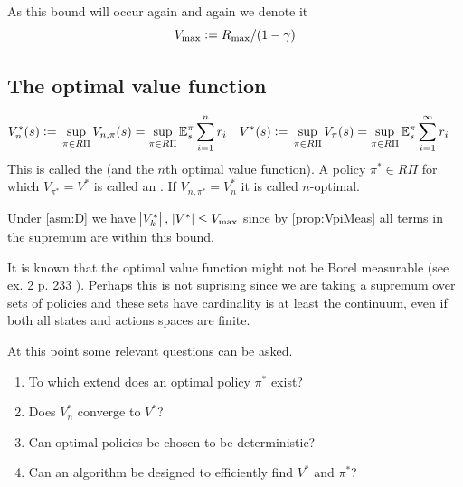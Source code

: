 \begin{rem}
  As this bound will occur again and again we denote it
  \begin{equation}
    V_{\max} \vcentcolon= R_{\max}/(1-\gamma)
    \label{eq:VmaxDef}
  \end{equation}
\end{rem}

\subsection{The optimal value function}

\begin{defn} 
  \begin{align*}
    V_n^*(s) \vcentcolon= & \; \sup_{\pi \in R\Pi} V_{n,\pi}(s)
    = \sup_{\pi \in R\Pi} \mathbb{E}_s^\pi \sum_{i=1}^n r_i
    &
    V^*(s) \vcentcolon= & \; \sup_{\pi \in R\Pi} V_\pi(s)
    = \sup_{\pi \in R\Pi} \mathbb{E}_s^\pi \sum_{i=1}^\infty r_i
  \end{align*}
  This is called the  (and the $n$th
  optimal value function).
  A policy $\pi^* \in R\Pi$ for which $V_{\pi^*} = V^*$ is called an
  .
  If $V_{n, \pi^*} = V^*_n$ it is called $n$-optimal.
  \label{defn:optimalValue}
\end{defn}

\begin{rem} Under \cref{asm:D} we have
  $\abs{V^*_k},\; \abs{V^*} \leq V_{\max}$ since by
  \cref{prop:VpiMeas} all terms in the supremum are within this bound.
\end{rem}

\begin{rem}
It is known that the optimal value function
might not be Borel measurable (see ex. 2 p. 233 ).
Perhaps this is not suprising since we are taking a supremum over
sets of policies and these sets have cardinality is at least the continuum,
even if both all states and actions spaces are finite.
\end{rem}

At this point some relevant questions can be asked.
\begin{enumerate}
  \item To which extend does an optimal policy $\pi^*$ exist?
  \item Does $V_n^*$ converge to $V^*$?
  \item Can optimal policies be chosen to be deterministic?
  \item Can an algorithm be designed to efficiently find $V^*$ and
    $\pi^*$?
\end{enumerate}

